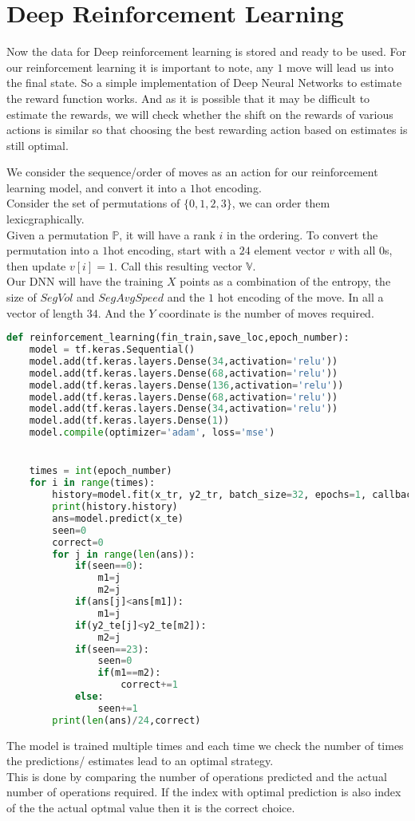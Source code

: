 \section{Deep Reinforcement Learning}
Now the data for Deep reinforcement learning is stored and ready to be used. For our reinforcement learning it is important to note, any $1$ move will lead us into the final state. So a simple implementation of Deep Neural Networks to estimate the reward function works. And as it is possible that it may be difficult to estimate the rewards, we will check whether the shift on the rewards of various actions is similar so that choosing the best rewarding action based on estimates is still optimal.
\par We consider the sequence/order of moves as an action for our reinforcement learning model, and convert it into a $1$hot encoding.\\
Consider the set of permutations of $\{0,1,2,3\}$, we can order them lexicgraphically.\\
Given a permutation $\mathbb{P}$, it will have a rank $i$ in the ordering. To convert the permutation into a $1$hot encoding, start with a $24$ element vector $v$ with all $0$s, then update $v[i]=1$. Call this resulting vector $\mathbb{V}$.\\
Our DNN will have the training $X$ points as a combination of the entropy, the size of $SegVol$ and $SegAvgSpeed$ and the $1$ hot encoding of the move. In all a vector of length $34$. And the $Y$ coordinate is the number of moves required.\\

\begin{lstlisting}[language=Python]
def reinforcement_learning(fin_train,save_loc,epoch_number):
    model = tf.keras.Sequential()
    model.add(tf.keras.layers.Dense(34,activation='relu'))
    model.add(tf.keras.layers.Dense(68,activation='relu'))
    model.add(tf.keras.layers.Dense(136,activation='relu'))
    model.add(tf.keras.layers.Dense(68,activation='relu'))
    model.add(tf.keras.layers.Dense(34,activation='relu'))
    model.add(tf.keras.layers.Dense(1))
    model.compile(optimizer='adam', loss='mse')


    times = int(epoch_number)
    for i in range(times):
        history=model.fit(x_tr, y2_tr, batch_size=32, epochs=1, callbacks=[cp_callback])
        print(history.history)
        ans=model.predict(x_te)
        seen=0
        correct=0
        for j in range(len(ans)):
            if(seen==0):
                m1=j
                m2=j
            if(ans[j]<ans[m1]):
                m1=j
            if(y2_te[j]<y2_te[m2]):
                m2=j
            if(seen==23):
                seen=0
                if(m1==m2):
                    correct+=1
            else:
                seen+=1
        print(len(ans)/24,correct)
\end{lstlisting}
The model is trained multiple times and each time we check the number of times the predictions/ estimates lead to an optimal strategy.\\
This is done by comparing the number of operations predicted and the actual number of operations required. If the index with optimal prediction is also index of the the actual optmal value then it is the correct choice.
